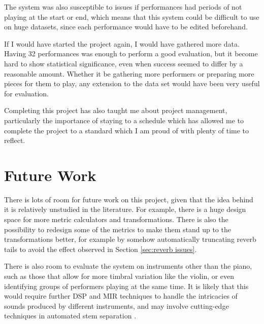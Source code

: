 \documentclass[oneside, class=book, 12pt, crop=false]{standalone}
\begin{document}
The system was also susceptible to issues if performances had periods of not playing at the start or end, which means that this system could be difficult to use on huge datasets, since each performance would have to be edited beforehand.

If I would have started the project again, I would have gathered more data. Having 32 performances was enough to perform a good evaluation, but it become hard to show statistical significance, even when success seemed to differ by a reasonable amount. Whether it be gathering more performers or preparing more pieces for them to play, any extension to the data set would have been very useful for evaluation.

Completing this project has also taught me about project management, particularly the importance of staying to a schedule which has allowed me to complete the project to a standard which I am proud of with plenty of time to reflect.

\section{Future Work}

There is lots of room for future work on this project, given that the idea behind it is relatively unstudied in the literature. For example, there is a huge design space for more metric calculators and transformations. There is also the possibility to redesign some of the metrics to make them stand up to the transformations better, for example by somehow automatically truncating reverb tails to avoid the effect observed in Section \ref{sec:reverb issues}.

There is also room to evaluate the system on instruments other than the piano, such as those that allow for more timbral variation like the violin, or even identifying groups of performers playing at the same time. It is likely that this would require further DSP and MIR techniques to handle the intricacies of sounds produced by different instruments, and may involve cutting-edge techniques in automated stem separation \cite{Hennequin2020}.


\ifstandalone
  \printbibliography
\fi
    
\end{document}
